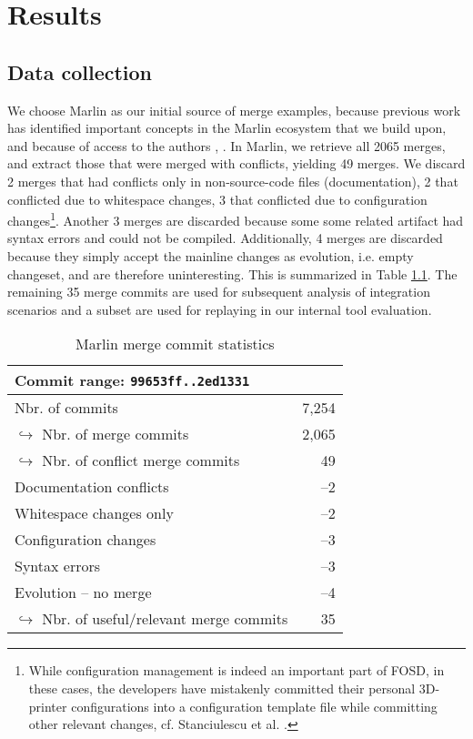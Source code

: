\chapter{Results}

\section{Data collection}
We choose Marlin as our initial source of merge examples, because previous work has identified important concepts in the Marlin ecosystem that we build upon, and because of access to the authors \cite{stanciulescu2015}, \cite{stanciulescu2016concepts}. In Marlin, we retrieve all 2065 merges, and extract those that were merged with conflicts, yielding 49 merges. We discard 2 merges that had conflicts only in non-source-code files (documentation), 2 that conflicted due to whitespace changes, 3 that conflicted due to configuration changes\footnote{While configuration management is indeed an important part of FOSD, in these cases, the developers have mistakenly committed their personal 3D-printer configurations into a configuration template file while committing other relevant changes, cf. Stanciulescu et al. \cite{stanciulescu2015}.}. Another 3 merges are discarded because some some related artifact had syntax errors and could not be compiled. Additionally, 4 merges are discarded because they simply accept the mainline changes as evolution, i.e. empty changeset, and are therefore uninteresting. This is summarized in Table \ref{tab:marlinmerge}. The remaining 35 merge commits are used for subsequent analysis of integration scenarios and a subset are used for replaying in our internal tool evaluation.

\begin{table}[h]
    \centering
    \caption{Marlin merge commit statistics}
    \label{tab:marlinmerge}
    \begin{tabular}{l r}
    \hline\hline
        Commit range: \texttt{99653ff..2ed1331}& \\\hline
        Nbr. of commits & 7,254\\
        $\hookrightarrow$ Nbr. of merge commits & 2,065 \\
        \hspace{1em}$\hookrightarrow$ Nbr. of conflict merge commits & 49 \\
        \hspace{1em}Documentation conflicts & --2\\
        \hspace{1em}Whitespace changes only & --2\\
        \hspace{1em}Configuration changes & --3\\
        \hspace{1em}Syntax errors & --3\\
        \hspace{1em}Evolution -- no merge & --4\\
        \hspace{2em}$\hookrightarrow$ Nbr. of useful/relevant merge commits & 35\\
    \hline\hline
    \end{tabular}
\end{table}


